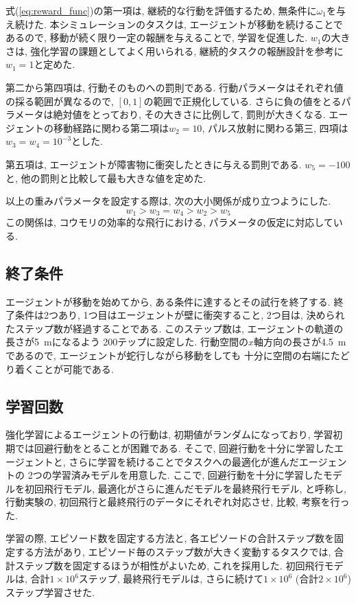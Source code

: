 \documentclass[../main]{subfiles}
\begin{document}
式(\ref{eq:reward_func})の第一項は, 
継続的な行動を評価するため, 無条件に$\omega_1$を与え続けた.
本シミュレーションのタスクは, 
エージェントが移動を続けることであるので, 
移動が続く限り一定の報酬を与えることで, 学習を促進した.
$w_1$の大きさは, 強化学習の課題としてよく用いられる, 
継続的タスクの報酬設計を参考に$w_1=1$と定めた.

第二から第四項は, 行動そのものへの罰則である.
行動パラメータはそれぞれ値の採る範囲が異なるので, 
$[0, 1]$の範囲で正規化している.
さらに負の値をとるパラメータは絶対値をとっており, 
その大きさに比例して, 罰則が大きくなる.
エージェントの移動経路に関わる第二項は$w_2=10$, 
パルス放射に関わる第三, 四項は$w_3=w_4=10^{-3}$とした. 

第五項は, エージェントが障害物に衝突したときに与える罰則である.
$w_5=-100$と, 他の罰則と比較して最も大きな値を定めた.

以上の重みパラメータを設定する際は, 
次の大小関係が成り立つようにした.
$$
w_1>w_3=w_4>w_2>w_5
$$
この関係は, コウモリの効率的な飛行における, 
パラメータの仮定に対応している.


\subsection{終了条件}
エージェントが移動を始めてから, 
ある条件に達するとその試行を終了する.
終了条件は2つあり, 1つ目はエージェントが壁に衝突すること, 
2つ目は, 決められたステップ数が経過することである.
このステップ数は, エージェントの軌道の長さが\SI{5}{\metre}になるよう
200テップに設定した. 
行動空間の$x$軸方向の長さが\SI{4.5}{\metre}であるので, 
エージェントが蛇行しながら移動をしても
十分に空間の右端にたどり着くことが可能である.


\subsection{学習回数}
強化学習によるエージェントの行動は, 
初期値がランダムになっており, 
学習初期では回避行動をとることが困難である.
そこで, 回避行動を十分に学習したエージェントと, 
さらに学習を続けることでタスクへの最適化が進んだエージェントの
2つの学習済みモデルを用意した.
ここで, 回避行動を十分に学習したモデルを初回飛行モデル, 
最適化がさらに進んだモデルを最終飛行モデル, と呼称し, 
行動実験の, 初回飛行と最終飛行のデータにそれぞれ対応させ, 
比較, 考察を行った.

学習の際, エピソード数を固定する方法と, 
各エピソードの合計ステップ数を固定する方法があり, 
エピソード毎のステップ数が大きく変動するタスクでは, 
合計ステップ数を固定するほうが相性がよいため, これを採用した. 
初回飛行モデルは, 合計$1\times 10^6$ステップ,
最終飛行モデルは, さらに続けて$1\times 10^6$
(合計$2\times 10^6$)ステップ学習させた.
\end{document}
